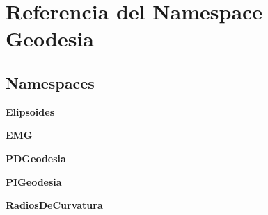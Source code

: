 \section{Referencia del Namespace Geodesia}
\label{namespaceGeodesia}
\subsection*{Namespaces}
\begin{DoxyCompactItemize}
\item 
{\bf Elipsoides}
\item 
{\bf E\-M\-G}
\item 
{\bf P\-D\-Geodesia}
\item 
{\bf P\-I\-Geodesia}
\item 
{\bf Radios\-De\-Curvatura}
\end{DoxyCompactItemize}
